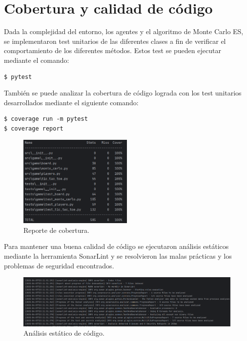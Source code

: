 
\chapter{Cobertura y calidad de código} %

\label{Cobertura y calidad de código}

Dada la complejidad del entorno, los agentes y el algoritmo de Monte Carlo ES, se implementaron test unitarios de las diferentes clases a fin de verificar el comportamiento de los diferentes métodos. Estos test se pueden ejecutar mediante el comando:

\begin{verbatim}
$ pytest
\end{verbatim}

También se puede analizar la cobertura de código lograda con los test unitarios desarrollados mediante el siguiente comando:

\begin{verbatim}
$ coverage run -m pytest
$ coverage report
\end{verbatim}

\begin{figure}[htbp]
	\centering
	\includegraphics[width=0.5\textwidth]{./Figures/coverage.png}
	\caption{Reporte de cobertura.}
	\label{fig:coverage}
\end{figure}

Para mantener una buena calidad de código se ejecutaron análisis estáticos mediante la herramienta SonarLint y se resolvieron las malas prácticas y los problemas de seguridad encontrados.

\begin{figure}[htbp]
	\centering
	\includegraphics[width=\textwidth]{./Figures/sonar.png}
	\caption{Análisis estático de código.}
	\label{fig:coverage}
\end{figure}

